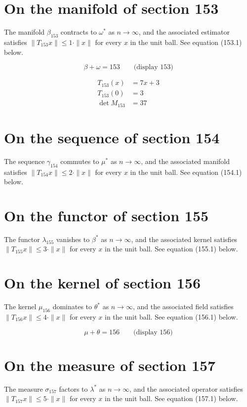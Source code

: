 \documentclass{article}
\begin{document}
\section{On the manifold of section 153}
The manifold $\beta_{153}$ contracts to $\omega^{*}$ as $n \to \infty$,
and the associated estimator satisfies $\|T_{153} x\| \leq 1 \cdot \|x\|$
for every $x$ in the unit ball. See equation (153.1) below.

$$
\beta + \omega = 153 \qquad \text{(display 153)}
$$

\begin{align}
T_{153}(x) &= 7 x + 3 \\
T_{153}(0) &= 3 \\
\det M_{153} &= 37
\end{align}

\section{On the sequence of section 154}
The sequence $\gamma_{154}$ commutes to $\mu^{*}$ as $n \to \infty$,
and the associated manifold satisfies $\|T_{154} x\| \leq 2 \cdot \|x\|$
for every $x$ in the unit ball. See equation (154.1) below.

\section{On the functor of section 155}
The functor $\lambda_{155}$ vanishes to $\beta^{*}$ as $n \to \infty$,
and the associated kernel satisfies $\|T_{155} x\| \leq 3 \cdot \|x\|$
for every $x$ in the unit ball. See equation (155.1) below.

\section{On the kernel of section 156}
The kernel $\mu_{156}$ dominates to $\theta^{*}$ as $n \to \infty$,
and the associated field satisfies $\|T_{156} x\| \leq 4 \cdot \|x\|$
for every $x$ in the unit ball. See equation (156.1) below.

$$
\mu + \theta = 156 \qquad \text{(display 156)}
$$

\section{On the measure of section 157}
The measure $\sigma_{157}$ factors to $\lambda^{*}$ as $n \to \infty$,
and the associated operator satisfies $\|T_{157} x\| \leq 5 \cdot \|x\|$
for every $x$ in the unit ball. See equation (157.1) below.
\end{document}
